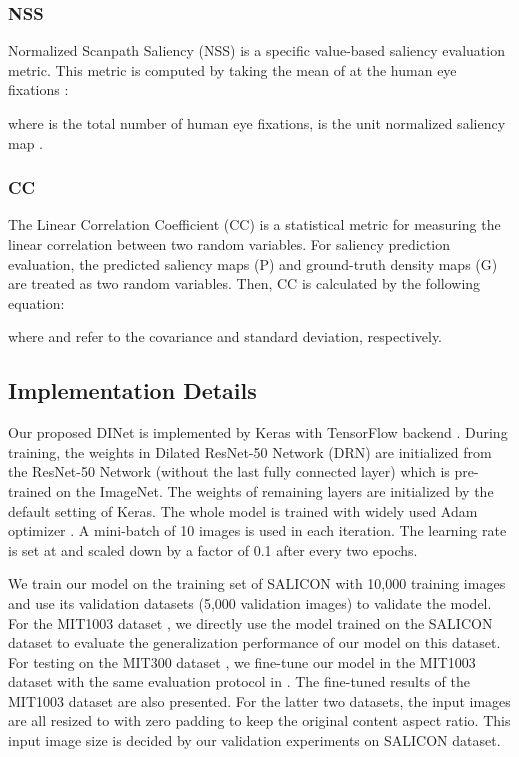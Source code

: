 \subsubsection{NSS}
Normalized Scanpath Saliency (NSS) is a specific value-based saliency evaluation metric. This metric is computed by taking the mean of  at the human eye fixations :


where  is the total number of human eye fixations,   is the unit normalized saliency map . 

\subsubsection{CC}
The Linear Correlation Coefficient (CC) is a statistical metric for measuring the linear correlation between two random variables. For saliency prediction evaluation, the predicted saliency maps (P) and ground-truth density maps (G) are treated as two random variables. Then, CC is calculated by the following equation:

where  and  refer to the covariance and standard deviation, respectively. 







\subsection{Implementation Details} 
Our proposed DINet is implemented by Keras with TensorFlow backend \cite{chollet2015keras,abadi2016tensorflow}. During training, the weights in Dilated ResNet-50 Network (DRN) are initialized from the ResNet-50 Network (without the last fully connected layer) which is pre-trained on the ImageNet. The weights of remaining layers are initialized by the default setting of Keras. The whole model is trained with widely used Adam optimizer \cite{kingma2014adam}. A mini-batch of 10 images is used in each iteration. The learning rate is set at  and scaled down by a factor of 0.1 after every two epochs. 


We train our model on the training set of SALICON \cite{jiang2015salicon} with 10,000 training images and use its validation datasets (5,000 validation images) to validate the model. For the MIT1003 dataset \cite{judd2009learning}, we directly use the model trained on the SALICON dataset to evaluate the generalization performance of our model on this dataset. For testing on the MIT300 dataset \cite{Judd_2012}, we fine-tune our model in the MIT1003 dataset with the same evaluation protocol in \cite{cornia2016predicting,liu2016deep}. The fine-tuned results of the MIT1003 dataset are also presented. For the latter two datasets, the input images are all resized to  with zero padding to keep the original content aspect ratio. This input image size is decided by our validation experiments on SALICON dataset.

